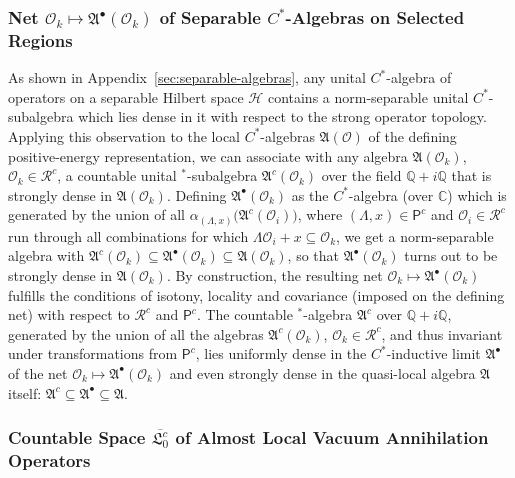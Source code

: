 \documentclass[a4paper,a4paper]{article}
\numberwithin{equation}{section}
\newcommand{\Cbb}{\mathbb{C}}
\newcommand{\Qbb}{\mathbb{Q}}
\newcommand{\Afrak}{\mathfrak{A}}
\newcommand{\Hscr}{\mathscr{H}}
\newcommand{\aLax}{\alpha_{( \Lambda , x )}}
\newcommand{\Oi}{\mathscr{O}_i}
\newcommand{\Ok}{\mathscr{O}_k}
\newcommand{\AO}{\mathfrak{A} ( \mathscr{O} )}
\newcommand{\AOk}{\mathfrak{A} ( \mathscr{O}_k )}
\newcommand{\Pcount}{\mathsf{P}^c}
\newcommand{\Rcount}{\mathscr{R}^c}
\newcommand{\Acount}{\mathfrak{A}^c}
\newcommand{\AcountOi}{\mathfrak{A}^c ( \mathscr{O}_i )}
\newcommand{\AcountOk}{\mathfrak{A}^c ( \mathscr{O}_k )}
\newcommand{\vaccountbar}{\overline{\mathfrak{L}_0^c}}
\newcommand{\Abullet}{\mathfrak{A}^\bullet}
\newcommand{\AbulletOk}{\mathfrak{A}^\bullet ( \mathscr{O}_k )}
\theoremstyle{definition}
\theoremstyle{plain}
\theoremstyle{remark}
\theoremstyle{assumption}
\begin{document}
  \subsubsection{Net $\Ok \mapsto \AbulletOk$ of Separable
    $C^*$-Algebras on Selected Regions}

  As shown in Appendix~\ref{sec:separable-algebras}, any unital
  $C^*$-algebra of operators on a separable Hilbert space $\Hscr$
  contains a norm-separable unital $C^*$-subalgebra which lies dense
  in it with respect to the strong operator topology. Applying this
  observation to the local $C^*$-algebras $\AO$ of the defining
  positive-energy representation, we can associate with any algebra
  $\AOk$, $\Ok \in \Rcount$, a countable unital $^*$-subalgebra
  $\AcountOk$ over the field $\Qbb + i \Qbb$ that is strongly dense in
  $\AOk$. Defining $\AbulletOk$ as the $C^*$-algebra (over $\Cbb$)
  which is generated by the union of all $\aLax \bigl( \AcountOi
  \bigr)$, where $( \Lambda , x ) \in \Pcount$ and $\Oi \in \Rcount$
  run through all combinations for which $\Lambda \Oi + x \subseteq
  \Ok$, we get a norm-separable algebra with $\AcountOk \subseteq
  \AbulletOk \subseteq \AOk$, so that $\AbulletOk$ turns out to be
  strongly dense in $\AOk$. By construction, the resulting net $\Ok
  \mapsto \AbulletOk$ fulfills the conditions of isotony, locality and
  covariance (imposed on the defining net) with respect to $\Rcount$
  and $\Pcount$. The countable $^*$-algebra $\Acount$ over $\Qbb + i
  \Qbb$, generated by the union of all the algebras $\AcountOk$, $\Ok
  \in \Rcount$, and thus invariant under transformations from
  $\Pcount$, lies uniformly dense in the $C^*$-inductive limit
  $\Abullet$ of the net $\Ok \mapsto \AbulletOk$ and even strongly
  dense in the quasi-local algebra $\Afrak$ itself: $\Acount \subseteq
  \Abullet \subseteq \Afrak$.
  
  \subsubsection{Countable Space $\vaccountbar$ of Almost Local Vacuum
    Annihilation Operators} 
  
\end{document}
